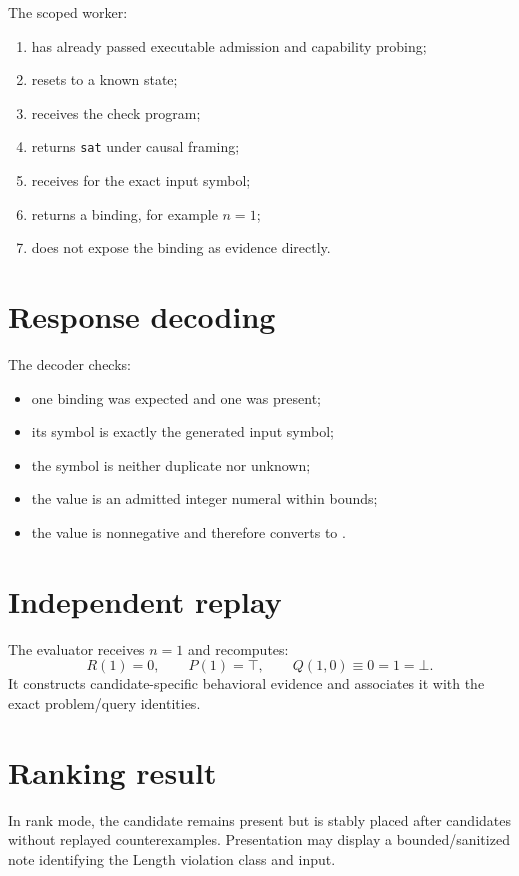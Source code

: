 \documentclass[10pt,letterpaper,oneside]{report}
\newcommand{\code}[1]{\texttt{\detokenize{#1}}}
\newcommand{\sat}{\texttt{sat}}
\begin{document}
The scoped worker:

\begin{enumerate}
\item has already passed executable admission and capability probing;
\item resets to a known state;
\item receives the check program;
\item returns \sat{} under causal framing;
\item receives \code{get-value} for the exact input symbol;
\item returns a binding, for example $n=1$;
\item does not expose the binding as evidence directly.
\end{enumerate}

\section{Response decoding}

The decoder checks:

\begin{itemize}
\item one binding was expected and one was present;
\item its symbol is exactly the generated input symbol;
\item the symbol is neither duplicate nor unknown;
\item the value is an admitted integer numeral within bounds;
\item the value is nonnegative and therefore converts to \code{Natural}.
\end{itemize}

\section{Independent replay}

The evaluator receives $n=1$ and recomputes:
\[
  R(1)=0,
  \qquad P(1)=\top,
  \qquad Q(1,0)\equiv 0=1=\bot.
\]
It constructs candidate-specific behavioral evidence and associates it with the exact problem/query identities.

\section{Ranking result}

In rank mode, the candidate remains present but is stably placed after candidates without replayed counterexamples. Presentation may display a bounded/sanitized note identifying the Length violation class and input.
\end{document}
